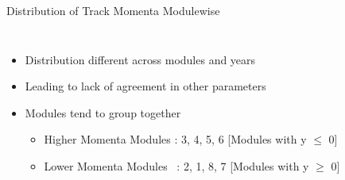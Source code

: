 \begin{frame}{Distribution of Track Momenta Modulewise}
\begin{columns}
\begin{column}{0.6\linewidth}
\begin{figure}
            \end{figure}
        \end{column}
    \end{columns}

    \begin{itemize}
        \small
        \item Distribution different across modules and years 
        \item Leading to lack of agreement in other parameters
        \item Modules tend to group together
        \begin{itemize}
            \item Higher Momenta Modules : 3, 4, 5, 6  [Modules with y $\leq$ 0]
            \item Lower Momenta Modules \ : 2, 1, 8, 7 [Modules with y $\geq$ 0]
        \end{itemize}
    \end{itemize}
\end{frame}

